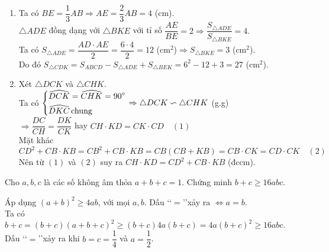 \begin{ex}
{\begin{enumerate}
        \item Ta có $BE=\dfrac{1}{3}AB\Rightarrow AE=\dfrac{2}{3}AB=4$ (cm).\\ $\triangle ADE$ đồng dạng với $\triangle BKE$ với tỉ số $\dfrac{AE}{BE}=2\Rightarrow \dfrac{S_{\triangle ADE}}{S_{\triangle BKE}}=4.$\\ Ta có $S_{\triangle ADE}=\dfrac{AD\cdot AE}{2}=\dfrac{6\cdot 4}{2}=12$ (cm$^2$)$\Rightarrow S_{\triangle BKE}=3$ (cm$^2$).\\ Do đó $S_{\triangle CDK}=S_{ABCD}-S_{\triangle ADE}+S_{\triangle BEK}=6^2-12+3=27$ (cm$^2$).
\item Xét $\triangle DCK$ và $\triangle CHK$.\\ Ta có $\left\{\begin{aligned}&\widehat{DCK}=\widehat{CHK}=90^\circ\\&\widehat{DKC} \,\text{chung}\end{aligned}\right.\Rightarrow \triangle DCK\backsim \triangle CHK$ (g.g)\\$\Rightarrow \dfrac{DC}{CH}=\dfrac{DK}{CK}$ hay $CH\cdot KD=CK\cdot CD\quad (1)$\\
Mặt khác $CD^2+CB\cdot KB=CB^2+CB\cdot KB=CB(CB+KB)=CB\cdot CK=CD\cdot CK\quad (2)$\\ Nên từ $(1)$ và $(2)$ suy ra $CH\cdot KD=CD^2+CB\cdot KB$ (đccm).
    \end{enumerate}
    }
\end{ex}

\begin{ex}%
    Cho $a,b,c$ là các số không âm thỏa $a+b+c=1$. Chứng minh $b+c\ge 16abc.$
\loigiai
    {Áp dụng $(a+b)^2\ge 4ab$, với mọi $a,b$. Dấu \lq\lq$=$\rq\rq xảy ra $\Leftrightarrow a=b.$\\ Ta có $b+c=(b+c)(a+b+c)^2\ge (b+c)4a(b+c)=4a(b+c)^2\ge 16abc.$
    \\Dấu \lq\lq$=$\rq\rq xảy ra khi $b=c=\dfrac{1}{4}$ và $a=\dfrac{1}{2}$.
    
    }
\end{ex}
